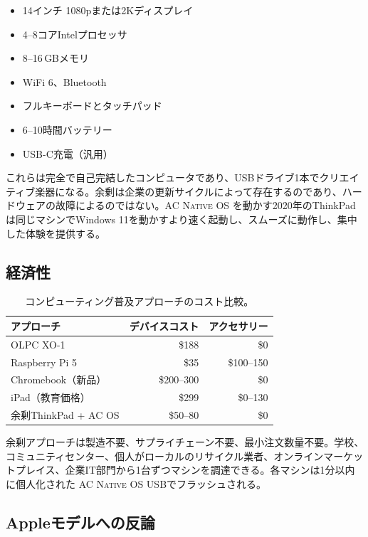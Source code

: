 \documentclass[10pt,letterpaper,twocolumn]{article}
\newcommand{\acos}{\textsc{AC Native OS}}
\begin{document}
\begin{itemize}
  \item 14インチ 1080pまたは2Kディスプレイ
  \item 4--8コアIntelプロセッサ
  \item 8--16\,GBメモリ
  \item WiFi 6、Bluetooth
  \item フルキーボードとタッチパッド
  \item 6--10時間バッテリー
  \item USB-C充電（汎用）
\end{itemize}

これらは完全で自己完結したコンピュータであり、USBドライブ1本でクリエイティブ楽器になる。余剰は企業の更新サイクルによって存在するのであり、ハードウェアの故障によるのではない。\acos{} を動かす2020年のThinkPadは同じマシンでWindows 11を動かすより速く起動し、スムーズに動作し、集中した体験を提供する。

\subsection{経済性}

\begin{table}[h]
\small
\centering
\begin{tabular}{lrr}
\toprule
\textbf{アプローチ} & \textbf{デバイスコスト} & \textbf{アクセサリー} \\
\midrule
OLPC XO-1 & \$188 & \$0 \\
Raspberry Pi 5 & \$35 & \$100--150 \\
Chromebook（新品） & \$200--300 & \$0 \\
iPad（教育価格） & \$299 & \$0--130 \\
余剰ThinkPad + AC OS & \$50--80 & \$0 \\
\bottomrule
\end{tabular}
\caption{コンピューティング普及アプローチのコスト比較。}
\label{tab:cost}
\end{table}

余剰アプローチは製造不要、サプライチェーン不要、最小注文数量不要。学校、コミュニティセンター、個人がローカルのリサイクル業者、オンラインマーケットプレイス、企業IT部門から1台ずつマシンを調達できる。各マシンは1分以内に個人化された \acos{} USBでフラッシュされる。

\subsection{Appleモデルへの反論}
\end{document}
